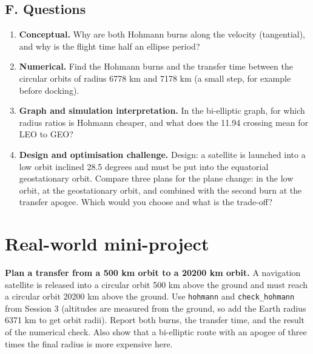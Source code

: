 \documentclass[11pt,a4paper]{article}
\begin{document}
\subsection*{F. Questions}
\begin{enumerate}[nosep]
\item \textbf{Conceptual.} Why are both Hohmann burns along the velocity (tangential), and why is the flight time half an ellipse period?
\item \textbf{Numerical.} Find the Hohmann burns and the transfer time between the circular orbits of radius 6778 km and 7178 km (a small step, for example before docking).
\item \textbf{Graph and simulation interpretation.} In the bi-elliptic graph, for which radius ratios is Hohmann cheaper, and what does the 11.94 crossing mean for LEO to GEO?
\item \textbf{Design and optimisation challenge.} Design: a satellite is launched into a low orbit inclined 28.5 degrees and must be put into the equatorial geostationary orbit. Compare three plans for the plane change: in the low orbit, at the geostationary orbit, and combined with the second burn at the transfer apogee. Which would you choose and what is the trade-off?
\end{enumerate}

\section{Real-world mini-project}
\textbf{Plan a transfer from a 500 km orbit to a 20200 km orbit.} A navigation satellite is released into a circular orbit 500 km above the ground and must reach a circular orbit 20200 km above the ground. Use \texttt{hohmann} and \texttt{check\_hohmann} from Session 3 (altitudes are measured from the ground, so add the Earth radius 6371 km to get orbit radii). Report both burns, the transfer time, and the result of the numerical check. Also show that a bi-elliptic route with an apogee of three times the final radius is more expensive here.
\end{document}
